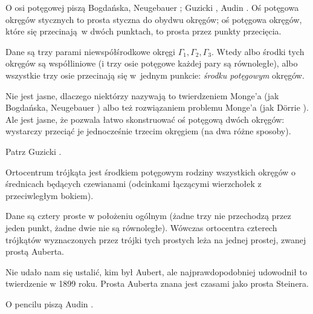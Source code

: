 O osi potęgowej piszą Bogdańska, Neugebauer \cite[s. 69]{neugebauer_2018}; Guzicki \cite[s. 173, 174]{guzicki_2021}, Audin \cite[s. 89]{audin_2003}.
Oś potęgowa okręgów stycznych to prosta styczna do obydwu okręgów; oś potęgowa okręgów, które się przecinają w dwóch punktach, to prosta przez punkty przecięcia.

\begin{proposition}
	Dane są trzy parami niewspółśrodkowe okręgi $\Gamma_1, \Gamma_2, \Gamma_3$.
	Wtedy albo środki tych okręgów są współliniowe (i trzy osie potęgowe każdej pary są równoległe), albo wszystkie trzy osie przecinają się w~jednym punkcie: \emph{środku potęgowym} okręgów.
\end{proposition}

Nie jest jasne, dlaczego niektórzy nazywają to twierdzeniem Monge'a (jak Bogdańska, Neugebauer \cite[s. ???]{neugebauer_2018}) albo też rozwiązaniem problemu Monge'a (jak Dörrie \cite[s. 151]{dorrie_1965}).
Ale jest jasne, że pozwala łatwo skonstruować oś potęgową dwóch okręgów: wystarczy przeciąć je jednocześnie trzecim okręgiem (na dwa różne sposoby).

Patrz Guzicki \cite[s. 174]{guzicki_2021}.

\begin{proposition}
	Ortocentrum trójkąta jest środkiem potęgowym rodziny wszystkich okręgów o średnicach będących czewianami (odcinkami łączącymi wierzchołek z przeciwległym bokiem).
\end{proposition}

\begin{theorem}[Auberta]
	Dane są cztery proste w położeniu ogólnym (żadne trzy nie przechodzą przez jeden punkt, żadne dwie nie są równoległe).
	Wówczas ortocentra czterech trójkątów wyznaczonych przez trójki tych prostych leża na jednej prostej, zwanej prostą Auberta.
\end{theorem}

Nie udało nam się ustalić, kim był Aubert, ale najprawdopodobniej udowodnił to twierdzenie w 1899 roku.
Prosta Auberta znana jest czasami jako prosta Steinera.

O pencilu piszą Audin \cite[s. 92-98]{audin_2003}.